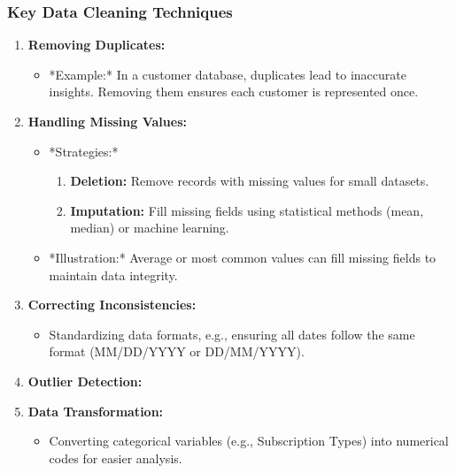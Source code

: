 \documentclass[aspectratio=169]{beamer}
\begin{document}
\begin{frame}[fragile]
    \frametitle{Key Data Cleaning Techniques}
    \begin{enumerate}
        \item \textbf{Removing Duplicates:}
            \begin{itemize}
                \item *Example:* In a customer database, duplicates lead to inaccurate insights. Removing them ensures each customer is represented once.
            \end{itemize}
        \item \textbf{Handling Missing Values:}
            \begin{itemize}
                \item *Strategies:*
                \begin{enumerate}
                    \item \textbf{Deletion:} Remove records with missing values for small datasets.
                    \item \textbf{Imputation:} Fill missing fields using statistical methods (mean, median) or machine learning.
                \end{enumerate}
                \item *Illustration:* Average or most common values can fill missing fields to maintain data integrity.
            \end{itemize}
        \item \textbf{Correcting Inconsistencies:}
            \begin{itemize}
                \item Standardizing data formats, e.g., ensuring all dates follow the same format (MM/DD/YYYY or DD/MM/YYYY).
            \end{itemize}
        \item \textbf{Outlier Detection:}
        \item \textbf{Data Transformation:}
            \begin{itemize}
                \item Converting categorical variables (e.g., Subscription Types) into numerical codes for easier analysis.
            \end{itemize}
    \end{enumerate}
\end{frame}
\end{document}
